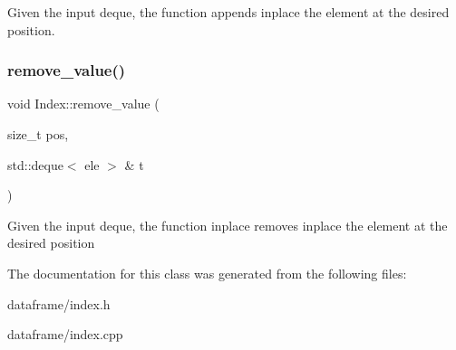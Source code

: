 Given the input deque, the function appends inplace the element at the desired position. \mbox{\label{classIndex_aa9a4aad39f0d19334fd2a144092b8004}} 
\subsubsection{\texorpdfstring{remove\+\_\+value()}{remove\_value()}}
{\footnotesize\ttfamily void Index\+::remove\+\_\+value (\begin{DoxyParamCaption}\item[{size\+\_\+t}]{pos,  }\item[{std\+::deque$<$ ele $>$ \&}]{t }\end{DoxyParamCaption})\hspace{0.3cm}{\ttfamily [private]}}

Given the input deque, the function inplace removes inplace the element at the desired position 

The documentation for this class was generated from the following files\+:\begin{DoxyCompactItemize}
\item 
dataframe/index.\+h\item 
dataframe/index.\+cpp\end{DoxyCompactItemize}
